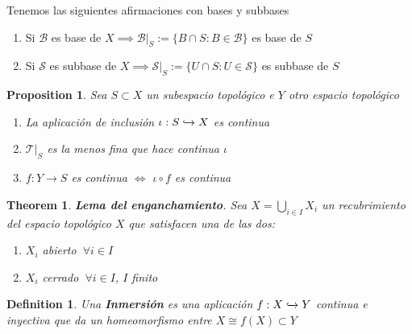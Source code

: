 \documentclass{myclass}
\newtheorem*{definition}{Definition}
\newtheorem*{theorem}{Theorem}
\newtheorem*{proposition}{Proposition}
\begin{document}
Tenemos las siguientes afirmaciones con bases y subbases
\begin{enumerate}[topsep=-6pt, itemsep=0pt]
  \item Si $\mathcal{B} $ es base de $X \implies \mathcal{B}|_S:=\{B\cap S:B\in \mathcal{B}\}$ es base de $S$ 
  \item Si $\mathcal{S} $ es subbase de $X \implies \mathcal{S}|_S:=\{U\cap S:U\in \mathcal{S}\}$ es subbase de $S$ 
\end{enumerate}

\begin{proposition}
Sea $S\subset X$ un subespacio topológico e $Y$ otro espacio topológico
 \begin{enumerate}[topsep=-6pt, itemsep=0pt]
  \item La aplicación de inclusión $\iota: S \xhookrightarrow{} X$ es continua
  \item  $\mathcal{T}|_S$ es la menos fina que hace continua $\iota$
  \item $f:Y\to  S$ es continua $\iff$ $\iota\circ f$ es continua
\end{enumerate}
\end{proposition}

\begin{theorem}
\textbf{Lema del enganchamiento}. Sea $X=\bigcup_{i\in I} X_i$ un recubrimiento del espacio topológico $X$ que satisfacen una de las dos:
\begin{enumerate}[topsep=-6pt, itemsep=0pt]
  \item $X_i$ abierto  $\ \forall i\in I$
  \item $X_i$ cerrado  $\ \forall i\in I$, $I$ finito 
\end{enumerate}
\end{theorem}

\begin{definition}
Una \textbf{Inmersión} es una aplicación $f: X \xhookrightarrow{} Y$ continua e inyectiva que da un homeomorfismo entre $X \cong f(X)\subset Y$
\end{definition}
\end{document}
